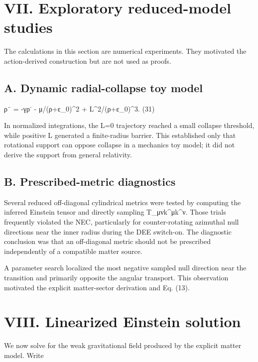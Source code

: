 \section{VII. Exploratory reduced-model
studies}\label{vii.-exploratory-reduced-model-studies}

The calculations in this section are numerical experiments. They
motivated the action-derived construction but are not used as proofs.

\subsection{A. Dynamic radial-collapse toy
model}\label{a.-dynamic-radial-collapse-toy-model}

ρ¨ = -γρ˙ - μ/(ρ+ε\_0)\^{}2 + L\^{}2/(ρ+ε\_0)\^{}3. (31)

In normalized integrations, the L=0 trajectory reached a small collapse
threshold, while positive L generated a finite-radius barrier. This
established only that rotational support can oppose collapse in a
mechanics toy model; it did not derive the support from general
relativity.

\subsection{B. Prescribed-metric
diagnostics}\label{b.-prescribed-metric-diagnostics}

Several reduced off-diagonal cylindrical metrics were tested by
computing the inferred Einstein tensor and directly sampling
T\_μνk\^{}μk\^{}ν. Those trials frequently violated the NEC,
particularly for counter-rotating azimuthal null directions near the
inner radius during the DEE switch-on. The diagnostic conclusion was
that an off-diagonal metric should not be prescribed independently of a
compatible matter source.

A parameter search localized the most negative sampled null direction
near the transition and primarily opposite the angular transport. This
observation motivated the explicit matter-sector derivation and Eq.
(13).

\section{VIII. Linearized Einstein
solution}\label{viii.-linearized-einstein-solution}

We now solve for the weak gravitational field produced by the explicit
matter model. Write

